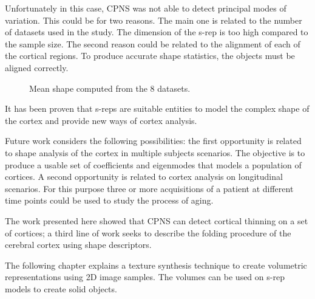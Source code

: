 Unfortunately in this case, CPNS was not able to detect principal modes of variation.
This could be for two reasons. The main one is related to the number of datasets 
used in the study. The dimension of the s-rep 
is too high compared to the sample size.
The second reason could be related to the alignment 
of each of the cortical regions. 
To produce accurate shape statistics, the objects must be aligned correctly.


\begin{figure}  
  \centering
  \caption[Mean shape of the cortex: CPNS and \textit{Freesurfer}.]{Mean shape computed from the 8 datasets.}
  \label{fig:CPNSMean}   
\end{figure}

It has been proven that s-reps are suitable 
entities to model the complex shape of the cortex and provide new ways of cortex analysis. 

Future work considers the following possibilities:
the first opportunity is related to shape analysis of the cortex in 
multiple subjects scenarios. The objective is to produce a usable set of coefficients
and eigenmodes that models a population of cortices.
A second opportunity is related to cortex analysis on longitudinal scenarios. 
For this purpose three or more acquisitions of a patient at different time points could be used 
to study the process of aging. 

The work presented here showed that CPNS can detect cortical thinning on a set of cortices; 
a third line of work seeks to describe the folding procedure of the cerebral cortex
using shape descriptors.

The following chapter explains a texture synthesis technique to create volumetric representations using 
2D image samples. The volumes can be used on s-rep models to create 
solid objects.


\newpage

